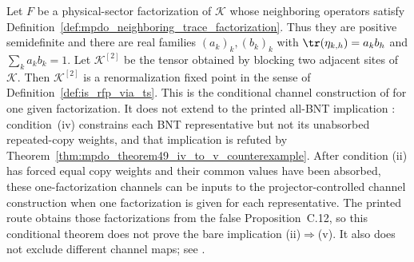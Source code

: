 \begin{lemma}
    \label{thm:mpdo_blocked_original_tensor_is_rfp_via_ts}
    \leanok
    Let $F$ be a physical-sector factorization of $\mathcal K$ whose
    neighboring operators satisfy
    Definition~\ref{def:mpdo_neighboring_trace_factorization}. Thus they are
    positive semidefinite and there are real families $(a_k)_k,(b_k)_k$ with
    $\tr(\eta_{k,h})=a_kb_h$ and $\sum_k a_kb_k=1$. Let $\mathcal K^{[2]}$ be
    the tensor obtained by blocking two adjacent sites of $\mathcal K$. Then
    $\mathcal K^{[2]}$ is a renormalization fixed point in the sense of
    Definition~\ref{def:is_rfp_via_ts}. This is the conditional channel
    construction of \cite[Proposition~C.7]{Cirac2016MPDO_arXiv} for one
    given factorization. It does not extend to the printed all-BNT
    implication \cite[Theorem~4.9, (iv)$\Rightarrow$(v)]
    {Cirac2016MPDO_arXiv}: condition~(iv) constrains each BNT representative
    but not its unabsorbed repeated-copy weights, and that implication is refuted by
    Theorem~\ref{thm:mpdo_theorem49_iv_to_v_counterexample}. After condition
    (ii) has forced equal copy weights and their common values have been
    absorbed, these one-factorization channels can be inputs to the
    projector-controlled channel construction when one factorization is given
    for each representative. The printed route obtains those factorizations
    from the false Proposition~C.12, so this conditional theorem does not prove
    the bare implication (ii)$\Rightarrow$(v). It also does not exclude
    different channel maps; see \cite{gap:cpgsv17_pf_rank_one}.
\end{lemma}

